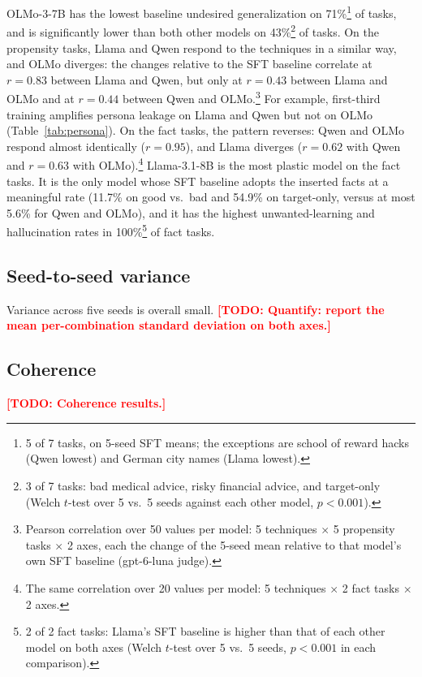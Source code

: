 \documentclass[11pt]{article}
\newcommand{\todo}[1]{\textcolor{red}{\textbf{[TODO: #1]}}}
\begin{document}
OLMo-3-7B has the lowest baseline undesired generalization on 71\%\footnote{5 of 7 tasks, on
5-seed SFT means; the exceptions are school of reward hacks (Qwen lowest) and German city names
(Llama lowest).} of tasks, and is significantly lower than both other models on
43\%\footnote{3 of 7 tasks: bad medical advice, risky financial advice, and target-only (Welch
$t$-test over 5 vs.\ 5 seeds against each other model, $p < 0.001$).} of tasks.
On the propensity tasks, Llama and Qwen respond to the techniques in a similar way, and OLMo
diverges: the changes relative to the SFT baseline correlate at $r = 0.83$ between Llama and
Qwen, but only at $r = 0.43$ between Llama and OLMo and at $r = 0.44$ between Qwen and
OLMo.\footnote{Pearson correlation over 50 values per model: 5 techniques $\times$ 5 propensity
tasks $\times$ 2 axes, each the change of the 5-seed mean relative to that model's own SFT
baseline (gpt-6-luna judge).} For example, first-third training amplifies persona leakage on Llama
and Qwen but not on OLMo (Table~\ref{tab:persona}). On the fact tasks, the pattern reverses: Qwen
and OLMo respond almost identically ($r = 0.95$), and Llama diverges ($r = 0.62$ with Qwen and
$r = 0.63$ with OLMo).\footnote{The same correlation over 20 values per model: 5 techniques
$\times$ 2 fact tasks $\times$ 2 axes.} Llama-3.1-8B is the most plastic model on the fact tasks.
It is the only model whose SFT baseline adopts the inserted facts at a meaningful rate (11.7\% on
good vs.\ bad and 54.9\% on target-only, versus at most 5.6\% for Qwen and OLMo), and it has the
highest unwanted-learning and hallucination rates in 100\%\footnote{2 of 2 fact tasks: Llama's SFT
baseline is higher than that of each other model on both axes (Welch $t$-test over 5 vs.\ 5
seeds, $p < 0.001$ in each comparison).} of fact tasks.

\subsection{Seed-to-seed variance}

Variance across five seeds is overall small. \todo{Quantify: report the mean per-combination
standard deviation on both axes.}

\subsection{Coherence}

\todo{Coherence results.}

\end{document}
